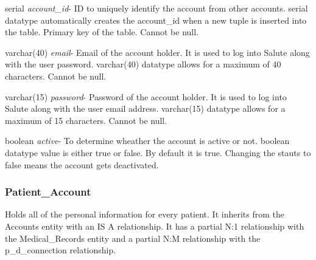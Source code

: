 \documentclass[12pt]{report}
\begin{document}
\begin{description}
\item serial \textit{account\_id}- ID to uniquely identify the account from other accounts. serial datatype automatically creates the account\_id when a new tuple is inserted into the table.  Primary key of the table.  Cannot be null.
\item varchar(40) \textit{email}- Email of the account holder. It is used to log into Salute along with the user password.  varchar(40) datatype allows for a maximum of 40 characters.  Cannot be null.
\item varchar(15) \textit{password}-  Password of the account holder.  It is used to log into Salute along with the user email address.  varchar(15) datatype allows for a maximum of 15 characters.  Cannot be null.
\item boolean \textit{active}- To determine wheather the account is active or not.  boolean datatype value is either true or false.  By default it is true.  Changing the stauts to false means the account gets deactivated.
\end{description}

\subsubsection{Patient\_Account}
Holds all of the personal information for every patient.  It inherits from the Accounts entity with an IS A relationship.  It has a partial N:1 relationship with the Medical\_Records entity and a partial N:M relationship with the p\_d\_connection relationship.
\end{document}
